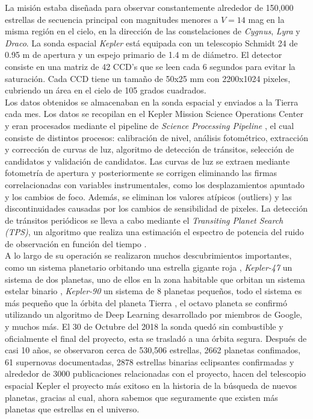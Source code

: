 La misión estaba diseñada para observar constantemente alrededor de 150,000 estrellas de secuencia principal con magnitudes menores a $V=14$ mag en la misma región en el cielo, en la dirección de las constelaciones de \textit{Cygnus}, \textit{Lyra} y \textit{Draco}. La sonda espacial \textit{Kepler} está equipada con un telescopio Schmidt 24 de 0.95 m de apertura y un espejo primario de 1.4 m de diámetro. El detector consiste en una matriz de 42 CCD’s que se leen cada 6 segundos para evitar la saturación. Cada CCD tiene un tamaño de 50x25 mm con 2200x1024 pixeles, cubriendo un área en el cielo de 105 grados cuadrados.\\

Los datos obtenidos se almacenaban en la sonda espacial y enviados a la Tierra cada mes. Los datos se recopilan en el Kepler Mission Science Operations Center y eran procesados mediante el pipeline de \textit{Science Processing Pipeline} \citep{jenkins2010overview}, el cual consiste de distintos procesos: calibración de nivel, análisis fotométrico, extracción y corrección de curvas de luz, algoritmo de detección de tránsitos, selección de candidatos y validación de candidatos. Las curvas de luz se extraen mediante fotometría de apertura y posteriormente se corrigen eliminando las firmas correlacionadas con variables instrumentales, como los desplazamientos apuntado y los cambios de foco.
Además, se eliminan los valores atípicos (outliers) y las discontinuidades causadas por los cambios de sensibilidad de pixeles. La detección de tránsitos periódicos se lleva a cabo mediante el \textit{Transiting Planet Search (TPS)}, un algoritmo que realiza una estimación el espectro de potencia del ruido de observación en función del tiempo \cite{jenkins2010transiting}.\\

A lo largo de su operación se realizaron muchos descubrimientos importantes, como un sistema planetario orbitando una estrella gigante roja \citep{charpinet2011compact}, \textit{Kepler-47} un sistema de dos planetas, uno de ellos en la zona habitable que orbitan un sistema estelar binario \citep{orosz2012kepler}, \textit{Kepler-90} un sistema de 8 planetas pequeños, todo el sistema es más pequeño que la órbita del planeta Tierra \citep{shallue2018identifying}, el octavo planeta se confirmó utilizando un algoritmo de Deep Learning desarrollado por miembros de Google, y muchos más. El 30 de Octubre del 2018 la sonda quedó sin combustible y oficialmente el final del proyecto, esta se trasladó a una órbita segura. Después de casi 10 años, se observaron cerca de 530,506 estrellas, 2662 planetas confimados, 61 supernovas documentadas, 2878 estrellas binarias eclipsantes confirmadas y alrededor de 3000 publicaciones relacionadas con el proyecto, hacen del telescopio espacial Kepler el proyecto más exitoso en la historia de la búsqueda de nuevos planetas, gracias al cual, ahora sabemos que seguramente que existen más planetas que estrellas en el universo.\\

